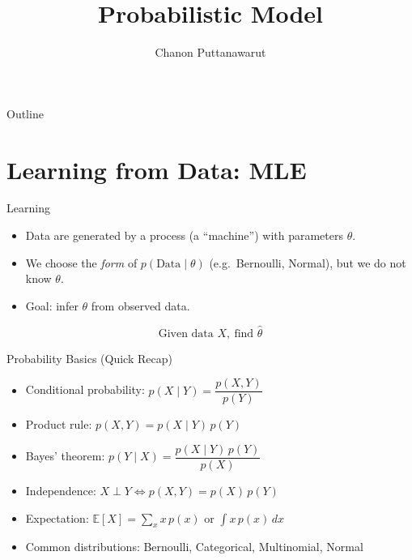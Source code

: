\documentclass[aspectratio=169]{beamer}
\title{Probabilistic Model}
\author{Chanon Puttanawarut}
\begin{document}
\begin{frame}
  \titlepage
\end{frame}

\begin{frame}{Outline}
  \tableofcontents
\end{frame}

\section{Learning from Data: MLE}

\begin{frame}{Learning}
\begin{itemize}
  \item Data are generated by a process (a ``machine'') with parameters $\theta$.
  \item We choose the \emph{form} of $p(\text{Data}\mid\theta)$ (e.g.\ Bernoulli, Normal), but we do not know $\theta$.
  \item Goal: infer $\theta$ from observed data.
\end{itemize}
\[
  \text{Given data } X,\ \text{find } \hat{\theta}
\]
\end{frame}

\begin{frame}{Probability Basics (Quick Recap)}
\begin{itemize}
  \item Conditional probability: $p(X\mid Y) = \dfrac{p(X,Y)}{p(Y)}$
  \item Product rule: $p(X,Y) = p(X\mid Y)\,p(Y)$
  \item Bayes' theorem: $p(Y\mid X) = \dfrac{p(X\mid Y)\,p(Y)}{p(X)}$
  \item Independence: $X \perp Y \iff p(X,Y) = p(X)\,p(Y)$
  \item Expectation: $\mathbb{E}[X] = \sum_x x\, p(x)$ or $\int x\, p(x)\,dx$
  \item Common distributions: Bernoulli, Categorical, Multinomial, Normal
\end{itemize}
\end{frame}
\end{document}
